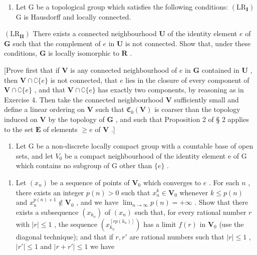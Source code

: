 \begin{enumerate}
\def\labelenumi{\arabic{enumi})}
\setcounter{enumi}{5}
\tightlist
\item
  Let G be a topological group which satisfies the following conditions: \((\mathrm{LR}_{\mathbf{I}})\) G is Hausdorff and locally connected.
\end{enumerate}

\((\mathrm{LR}_{\mathbf{II}})\) There exists a connected neighbourhood \(\mathbf{U}\) of the identity element \(e\) of \(\mathbf{G}\) such that the complement of \(e\) in \(\mathbf{U}\) is not connected. Show that, under these conditions, \(\mathbf{G}\) is locally isomorphic to \(\mathbf{R}\) .

{[}Prove first that if \(\mathbf{V}\) is any connected neighbourhood of \(e\) in \(\mathbf{G}\) contained in \(\mathbf{U}\) , then \(\mathbf{V} \cap \complement\{e\}\) is not connected, that \(e\) lies in the closure of every component of \(\mathbf{V} \cap \complement\{e\}\) , and that \(\mathbf{V} \cap \complement\{e\}\) has exactly two components, by reasoning as in Exercise 4. Then take the connected neighbourhood \(\mathbf{V}\) sufficiently small and define a linear ordering on \(\mathbf{V}\) such that \(\mathfrak{C}_0(\mathbf{V})\) is coarser than the topology induced on \(\mathbf{V}\) by the topology of \(\mathbf{G}\) , and such that Proposition 2 of § 2 applies to the set \(\mathbf{E}\) of elements \(\geqslant e\) of \(\mathbf{V}\) .{]}

\begin{enumerate}
\def\labelenumi{\arabic{enumi})}
\setcounter{enumi}{6}
\tightlist
\item
  Let G be a non-discrete locally compact group with a countable base of open sets, and let \(V_{0}\) be a compact neighbourhood of the identity element e of G which contains no subgroup of G other than \(\{e\}\) .
\end{enumerate}

\begin{enumerate}
\def\labelenumi{\alph{enumi})}
\tightlist
\item
  Let \((x_{n})\) be a sequence of points of \(\mathbf{V}_{0}\) which converges to \(e\) . For each \(n\) , there exists an integer \(p(n) > 0\) such that \(x_{n}^{k} \in \mathbf{V}_{0}\) whenever \(k \leqslant p(n)\) and \(x_{n}^{p(n)+1} \notin \mathbf{V}_{0}\) , and we have \(\lim_{n \to \infty} p(n) = +\infty\) . Show that there exists a subsequence \((x_{k_{n}})\) of \((x_{n})\) such that, for every rational number \(r\) with \(|r| \leqslant 1\) , the sequence \((x_{k_{n}}^{[rp(k_{n})]})\) has a limit \(f(r)\) in \(\mathbf{V}_{0}\) (use the diagonal technique); and that if \(r, r'\) are rational numbers such that \(|r| \leqslant 1\) , \(|r'| \leqslant 1\) and \(|r + r'| \leqslant 1\) we have
\end{enumerate}

